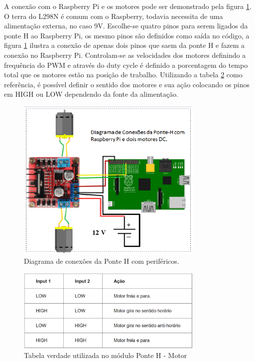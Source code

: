 A conexão com o Raspberry Pi e os motores pode ser demonstrado pela figura \ref{fig:esquematico_componentes}. O terra do L298N é comum com o
Raspberry, todavia necessita de uma alimentação externa, no caso 9V. Escolhe-se quatro pinos para serem ligados da ponte H ao Raspberry Pi,
os mesmo pinos são definidos como saída no código, a figura \ref{fig:esquematico_componentes} ilustra a conexão de apenas dois pinos que saem
da ponte H e fazem a conexão no Raspberry Pi. Controlam-se as velocidades dos motores definindo a frequência do PWM e através do duty cycle
é definido a porcentagem do tempo total que os motores estão na posição de trabalho. Utilizando a tabela \ref{fig:tabela_ponte_H_2} como
referência, é possível definir o sentido dos motores e sua ação colocando os pinos em HIGH ou LOW  dependendo da fonte da alimentação. 

\begin{figure}[H]
    \centering
    \includegraphics[width=0.8\textwidth]{figuras/esquematico_componentes.eps}
    \caption{Diagrama de conexões da Ponte H com periféricos.}
    \label{fig:esquematico_componentes}
\end{figure}

\begin{figure}[H]
    \centering
    \includegraphics[width=0.8\textwidth]{figuras/tabela_ponte_H_2.eps}
    \caption{Tabela verdade utilizada no módulo Ponte H - Motor}
    \label{fig:tabela_ponte_H_2}
\end{figure}

